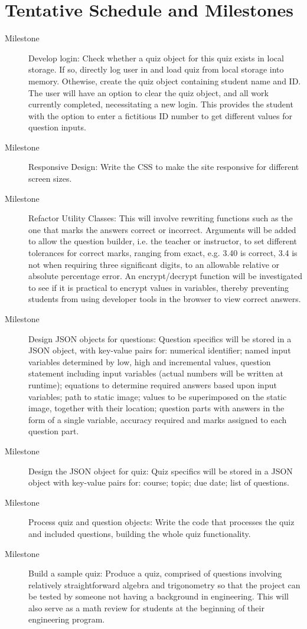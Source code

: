 \documentclass{tufte-handout}
\begin{document}
\section{\Large Tentative Schedule and Milestones}
\begin{description}
	\item [Milestone #1 (Week 1)] Develop login: Check whether a quiz object for this quiz exists in local storage. If so, directly log user in and load quiz from local storage into memory. Othewise, create the quiz object containing student name and ID. The user will have an option to clear the quiz object, and all work currently completed, necessitating a new login. This provides the student with the option to enter a fictitious ID number to get different values for question inputs.
	\item[Milestone #2 (Week 2)] Responsive Design: Write the CSS to make the site responsive for different screen sizes.
	\item[Milestone #3 (Week 4)] Refactor Utility Classes: This will involve rewriting functions such as the one that marks the answers correct or incorrect. Arguments will be added to allow the question builder, i.e. the teacher or instructor, to set different tolerances for correct marks, ranging from exact, e.g. 3.40 is correct, 3.4 is not when requiring three significant digits, to an allowable relative or absolute percentage error. An encrypt/decrypt function will be investigated to see if it is practical to encrypt values in variables, thereby preventing students from using developer tools in the browser to view correct answers.
	\item[Milestone #4a (Week 5)] Design JSON objects for questions: Question specifics will be stored in a JSON object, with key-value pairs for: numerical identifier; named input variables determined by low, high and incremental values, question statement including input variables (actual numbers will be written at runtime); equations to determine required answers based upon input variables; path to static image; values to be superimposed on the static image, together with their location; question parts with answers in the form of a single variable, accuracy required and marks assigned to each question part.
	\item[Milestone #4b (Week 5)] Design the JSON object for quiz: Quiz specifics will be stored in a JSON object with key-value pairs for: course; topic; due date; list of questions.
	\item[Milestone #5 (Week 9)] Process quiz and question objects: Write the code that processes the quiz and included questions, building the whole quiz functionality.
	\item[Milestone #6 (Week 10)] Build a sample quiz: Produce a quiz, comprised of questions involving relatively straightforward algebra and trigonometry so that the project can be tested by someone not having a background in engineering. This will also serve as a math review for students at the beginning of their engineering program.
\end{description}
\end{document}
